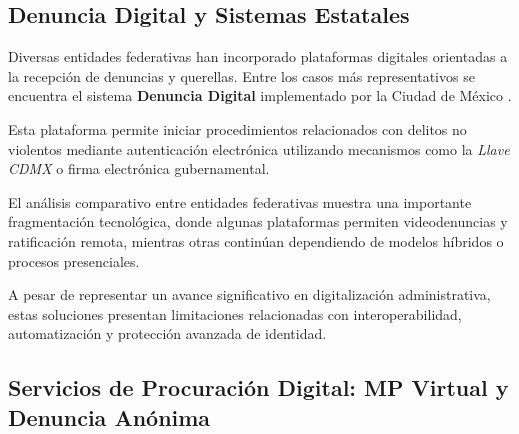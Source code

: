 
\subsection{Denuncia Digital y Sistemas Estatales}

\begin{flushleft}
\justifying

Diversas entidades federativas han incorporado plataformas digitales orientadas a la recepción de denuncias y querellas. Entre los casos más representativos se encuentra el sistema \textbf{Denuncia Digital} implementado por la Ciudad de México \cite{9}.

Esta plataforma permite iniciar procedimientos relacionados con delitos no violentos mediante autenticación electrónica utilizando mecanismos como la \textit{Llave CDMX} o firma electrónica gubernamental.

El análisis comparativo entre entidades federativas muestra una importante fragmentación tecnológica, donde algunas plataformas permiten videodenuncias y ratificación remota, mientras otras continúan dependiendo de modelos híbridos o procesos presenciales.

A pesar de representar un avance significativo en digitalización administrativa, estas soluciones presentan limitaciones relacionadas con interoperabilidad, automatización y protección avanzada de identidad.

\end{flushleft}


\subsection{Servicios de Procuración Digital: MP Virtual y Denuncia Anónima}

